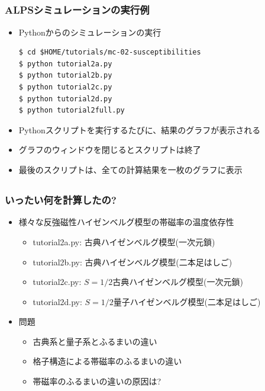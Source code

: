 \subsection*{\redm\whiteb\greenb}
\begin{frame}[t,fragile]
  \frametitle{ALPSシミュレーションの実行例}
  \begin{itemize}
    \item Pythonからのシミュレーションの実行
\begin{lstlisting}
$ cd $HOME/tutorials/mc-02-susceptibilities
$ python tutorial2a.py
$ python tutorial2b.py
$ python tutorial2c.py
$ python tutorial2d.py
$ python tutorial2full.py
\end{lstlisting}
    \item Pythonスクリプトを実行するたびに、結果のグラフが表示される
    \item グラフのウィンドウを閉じるとスクリプトは終了
    \item 最後のスクリプトは、全ての計算結果を一枚のグラフに表示
  \end{itemize}
\end{frame}

\subsection*{\redm\whiteb\greenb}
\begin{frame}[t,fragile]
  \frametitle{いったい何を計算したの?}
  \begin{itemize}
  \item 様々な反強磁性ハイゼンベルグ模型の帯磁率の温度依存性
    \begin{itemize}
    \item tutorial2a.py: 古典ハイゼンベルグ模型(一次元鎖)
    \item tutorial2b.py: 古典ハイゼンベルグ模型(二本足はしご)
    \item tutorial2c.py: $S=1/2$古典ハイゼンベルグ模型(一次元鎖)
    \item tutorial2d.py: $S=1/2$量子ハイゼンベルグ模型(二本足はしご)
    \end{itemize}
  \item 問題
    \begin{itemize}
      \item 古典系と量子系とふるまいの違い
      \item 格子構造による帯磁率のふるまいの違い
      \item 帯磁率のふるまいの違いの原因は?
    \end{itemize}
  \end{itemize}
\end{frame}

